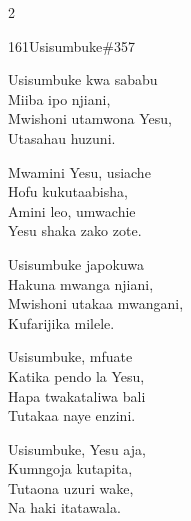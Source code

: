 \begin{multicols}{2}
\begin{hymn}{161}{Usisumbuke}{\#357}
\begin{stanza}
Usisumbuke kwa sababu\\
Miiba ipo njiani,\\
Mwishoni utamwona Yesu,\\
Utasahau huzuni.
\end{stanza}
\begin{chorus}
Mwamini Yesu, usiache\\
Hofu kukutaabisha,\\
Amini leo, umwachie\\
Yesu shaka zako zote.
\end{chorus}
\begin{stanza}
Usisumbuke japokuwa\\
Hakuna mwanga njiani,\\
Mwishoni utakaa mwangani,\\
Kufarijika milele.
\end{stanza}
\begin{stanza}
Usisumbuke, mfuate\\
Katika pendo la Yesu,\\
Hapa twakataliwa bali\\
Tutakaa naye enzini.
\end{stanza}
\begin{stanza}
Usisumbuke, Yesu aja,\\
Kumngoja kutapita,\\
Tutaona uzuri wake,\\
Na haki itatawala.
\end{stanza}
\end{hymn}


\end{multicols}
